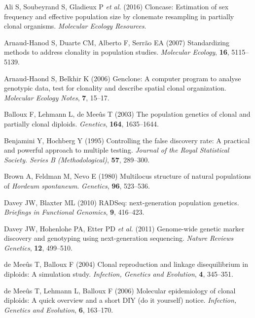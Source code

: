 \documentclass[]{article}
\theoremstyle{definition}
\theoremstyle{definition}
\theoremstyle{definition}
\theoremstyle{remark}
\begin{document}
\hypertarget{ref-ali2016cloncase}{}
Ali S, Soubeyrand S, Gladieux P \emph{et al.} (2016) Cloncase:
Estimation of sex frequency and effective population size by clonemate
resampling in partially clonal organisms. \emph{Molecular Ecology
Resources}.

\hypertarget{ref-arnaud2007standardizing}{}
Arnaud-Hanod S, Duarte CM, Alberto F, Serrão EA (2007) Standardizing
methods to address clonality in population studies. \emph{Molecular
Ecology}, \textbf{16}, 5115--5139.

\hypertarget{ref-arnaud2006genclone}{}
Arnaud-Haond S, Belkhir K (2006) Genclone: A computer program to analyse
genotypic data, test for clonality and describe spatial clonal
organization. \emph{Molecular Ecology Notes}, \textbf{7}, 15--17.

\hypertarget{ref-balloux2003population}{}
Balloux F, Lehmann L, de Meeûs T (2003) The population genetics of
clonal and partially clonal diploids. \emph{Genetics}, \textbf{164},
1635--1644.

\hypertarget{ref-benjamini1995controlling}{}
Benjamini Y, Hochberg Y (1995) Controlling the false discovery rate: A
practical and powerful approach to multiple testing. \emph{Journal of
the Royal Statistical Society. Series B (Methodological)}, \textbf{57},
289--300.

\hypertarget{ref-brown1980multilocus}{}
Brown A, Feldman M, Nevo E (1980) Multilocus structure of natural
populations of \emph{Hordeum spontaneum}. \emph{Genetics}, \textbf{96},
523--536.

\hypertarget{ref-davey2010rad}{}
Davey JW, Blaxter ML (2010) RADSeq: next-generation population genetics.
\emph{Briefings in Functional Genomics}, \textbf{9}, 416--423.

\hypertarget{ref-davey2011genome}{}
Davey JW, Hohenlohe PA, Etter PD \emph{et al.} (2011) Genome-wide
genetic marker discovery and genotyping using next-generation
sequencing. \emph{Nature Reviews Genetics}, \textbf{12}, 499--510.

\hypertarget{ref-de2004clonal}{}
de Meeûs T, Balloux F (2004) Clonal reproduction and linkage
disequilibrium in diploids: A simulation study. \emph{Infection,
Genetics and Evolution}, \textbf{4}, 345--351.

\hypertarget{ref-de2006molecular}{}
de Meeûs T, Lehmann L, Balloux F (2006) Molecular epidemiology of clonal
diploids: A quick overview and a short DIY (do it yourself) notice.
\emph{Infection, Genetics and Evolution}, \textbf{6}, 163--170.
\end{document}
